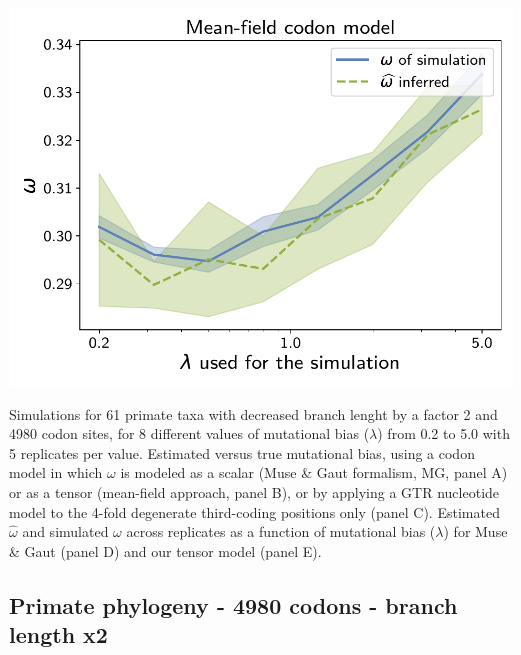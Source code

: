 \documentclass{article}
\begin{document}
\begin{center}
    \begin{minipage}{0.325\linewidth}
        \includegraphics[width=\linewidth, page=1]{inference_supp_mat/PrimatesExons10Mu0.5_omega_MF.pdf}
    \end{minipage}
\end{center}
Simulations for 61 primate taxa with decreased branch lenght by a factor 2 and 4980 codon sites, for 8 different values of mutational bias ($\lambda$) from 0.2 to 5.0 with 5 replicates per value.
Estimated versus true mutational bias, using a codon model in which $\omega$ is modeled as a scalar (Muse \& Gaut formalism, MG, panel A) or as a tensor (mean-field approach, panel B), or by applying a GTR nucleotide model to the 4-fold degenerate third-coding positions only (panel C).
Estimated $\hat{\omega}$ and simulated $\omega$ across replicates as a function of mutational bias ($\lambda$) for Muse \& Gaut (panel D) and our tensor model (panel E).

\subsection{Primate phylogeny - 4980 codons - branch length x2}
\end{document}
